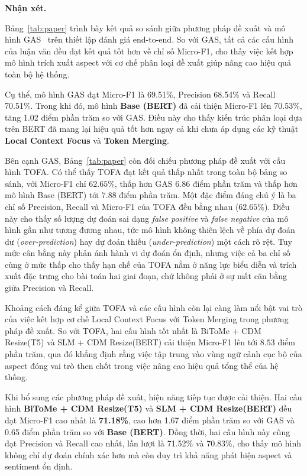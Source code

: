 \textbf{Nhận xét.}

Bảng~\ref{tab:paper} trình bày kết quả so sánh giữa phương pháp đề xuất và mô hình GAS~\cite{zhang2021gas} trên thiết lập đánh giá end-to-end. So với GAS, tất cả các cấu hình của luận văn đều đạt kết quả tốt hơn về chỉ số Micro-F1, cho thấy việc kết hợp mô hình trích xuất aspect với cơ chế phân loại đề xuất giúp nâng cao hiệu quả toàn bộ hệ thống.

Cụ thể, mô hình GAS đạt Micro-F1 là 69.51\%, Precision 68.54\% và Recall 70.51\%. Trong khi đó, mô hình \textbf{Base (BERT)} đã cải thiện Micro-F1 lên 70.53\%, tăng 1.02 điểm phần trăm so với GAS. Điều này cho thấy kiến trúc phân loại dựa trên BERT đã mang lại hiệu quả tốt hơn ngay cả khi chưa áp dụng các kỹ thuật \textbf{Local Context Focus} và \textbf{Token Merging}.

Bên cạnh GAS, Bảng~\ref{tab:paper} còn đối chiếu phương pháp đề
xuất với cấu hình TOFA. Có thể thấy TOFA đạt kết quả thấp nhất trong toàn bộ
bảng so sánh, với Micro-F1 chỉ $62.65\%$, thấp hơn GAS $6.86$ điểm phần trăm
và thấp hơn mô hình Base (BERT) tới $7.88$ điểm phần trăm. Một đặc điểm đáng
chú ý là ba chỉ số Precision, Recall và Micro-F1 của TOFA đều bằng nhau
($62.65\%$). Điều này cho thấy số lượng dự đoán sai dạng \textit{false positive}
và \textit{false negative} của mô hình gần như tương đương nhau, tức mô hình
không thiên lệch về phía dự đoán dư (\textit{over-prediction}) hay dự đoán
thiếu (\textit{under-prediction}) một cách rõ rệt. Tuy mức cân bằng này phản
ánh hành vi dự đoán ổn định, nhưng việc cả ba chỉ số cùng ở mức thấp cho thấy
hạn chế của TOFA nằm ở năng lực biểu diễn và trích xuất đặc trưng cho bài toán
hai giai đoạn, chứ không phải ở sự mất cân bằng giữa Precision và Recall.

Khoảng cách đáng kể giữa TOFA và các cấu hình còn lại càng làm nổi bật vai trò
của việc kết hợp cơ chế Local Context Focus với Token Merging trong phương
pháp đề xuất. So với TOFA, hai cấu hình tốt nhất là BiToMe + CDM Resize(T5)
và SLM + CDM Resize(BERT) cải thiện Micro-F1 lên tới $8.53$ điểm phần trăm,
qua đó khẳng định rằng việc tập trung vào vùng ngữ cảnh cục bộ của aspect đóng
vai trò then chốt trong việc nâng cao hiệu quả tổng thể của hệ thống.

Khi bổ sung các phương pháp đề xuất, hiệu năng tiếp tục được cải thiện. Hai cấu hình \textbf{BiToMe + CDM Resize(T5)} và \textbf{SLM + CDM Resize(BERT)} đều đạt Micro-F1 cao nhất là \textbf{71.18\%}, cao hơn 1.67 điểm phần trăm so với GAS và 0.65 điểm phần trăm so với \textbf{Base (BERT)}. Đồng thời, hai cấu hình này cũng đạt Precision và Recall cao nhất, lần lượt là 71.52\% và 70.83\%, cho thấy mô hình không chỉ dự đoán chính xác hơn mà còn duy trì khả năng phát hiện aspect và sentiment ổn định.

